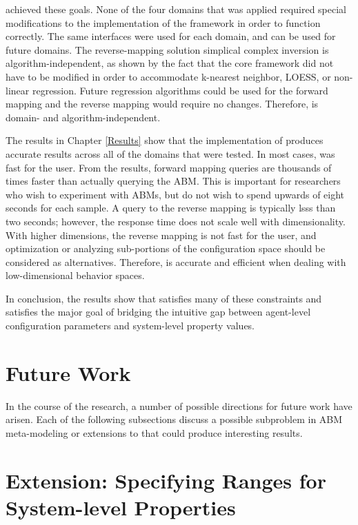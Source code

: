 \fw achieved these goals. None of the four domains that \fw was applied required special modifications to the implementation of the framework in order to function correctly.
The same interfaces were used for each domain, and can be used for future domains.
The reverse-mapping solution simplical complex inversion is algorithm-independent, as shown by the fact that the core framework did not have to be modified in order to accommodate k-nearest neighbor, LOESS, or non-linear regression.
Future regression algorithms could be used for the forward mapping and the reverse mapping would require no changes.
Therefore, \fw is domain- and algorithm-independent.

The results in Chapter \ref{Results} show that the implementation of \fw produces accurate results across all of the domains that were tested.
In most cases, \fw was fast for the user.
From the results, forward mapping queries are thousands of times faster than actually querying the ABM.
This is important for researchers who wish to experiment with ABMs, but do not wish to spend upwards of eight seconds for each sample.
A query to the reverse mapping is typically lsss than two seconds; however, the response time does not scale well with dimensionality.
With higher dimensions, the reverse mapping is not fast for the user, and optimization or analyzing sub-portions of the configuration space should be considered as alternatives.
Therefore, \fw is accurate and efficient when dealing with low-dimensional behavior spaces.

In conclusion, the results show that \fw satisfies many of these constraints and satisfies the major goal of bridging the intuitive gap between agent-level configuration parameters and system-level property values.

\section{Future Work}

In the course of the research, a number of possible directions for future work have arisen.
Each of the following subsections discuss a possible subproblem in ABM meta-modeling or extensions to \fw that could produce interesting results.

\section{Extension: Specifying Ranges for System-level Properties}
\label{sec:ranges}

